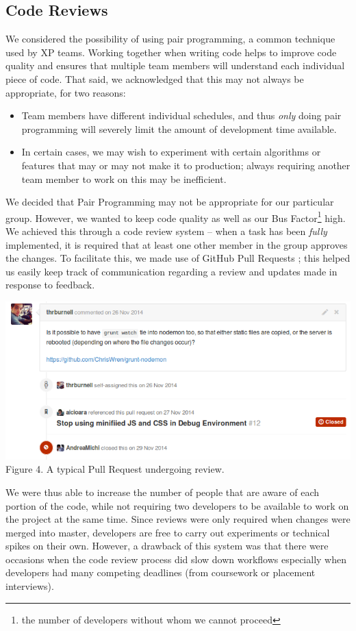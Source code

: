 \documentclass[a4paper, 10pt]{report}
\begin{document}
\subsection{Code Reviews}
We considered the possibility of using pair programming, a common technique used by XP teams. Working together when writing code helps to improve code quality and ensures that multiple team members will understand each individual piece of code. \cite{pair-program} That said, we acknowledged that this may not always be appropriate, for two reasons: \begin{itemize}
\item Team members have different individual schedules, and thus \textit{only} doing pair programming will severely limit the amount of development time available. 
\item In certain cases, we may wish to experiment with certain algorithms or features that may or may not make it to production; always requiring another team member to work on this may be inefficient.
\end{itemize}
We decided that Pair Programming may not be appropriate for our particular group. However, we wanted to keep code quality as well as our Bus Factor\footnote{the number of developers without whom we cannot proceed} high. We achieved this through a code review system -- when a task has been \textit{fully} implemented, it is required that at least one other member in the group approves the changes. To facilitate this, we made use of GitHub Pull Requests \cite{github-pull-req}; this helped us easily keep track of  communication regarding a review and updates made in response to feedback. 
\begin{center}
\includegraphics[scale=0.42]{pullreq.png}\\
Figure 4. A typical Pull Request undergoing review.
\end{center}
We were thus able to increase the number of people that are aware of each portion of the code, while not requiring two developers to be available to work on the project at the same time. Since reviews were only required when changes were merged into master, developers are free to carry out experiments or technical spikes on their own. However, a drawback of this system was that there were occasions when the code review process did slow down workflows especially when developers had many competing deadlines (from coursework or placement interviews).
\end{document}

